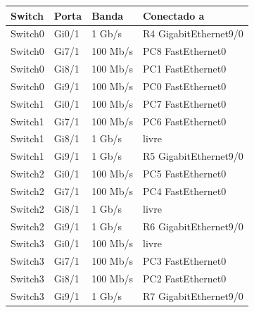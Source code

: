 \begin{tabular}{llll}
\toprule
Switch & Porta & Banda & Conectado a\\
\midrule
Switch0 & Gi0/1 & 1 Gb/s & R4 GigabitEthernet9/0\\
Switch0 & Gi7/1 & 100 Mb/s & PC8 FastEthernet0\\
Switch0 & Gi8/1 & 100 Mb/s & PC1 FastEthernet0\\
Switch0 & Gi9/1 & 100 Mb/s & PC0 FastEthernet0\\
\midrule
Switch1 & Gi0/1 & 100 Mb/s & PC7 FastEthernet0\\
Switch1 & Gi7/1 & 100 Mb/s & PC6 FastEthernet0\\
Switch1 & Gi8/1 & 1 Gb/s & livre\\
Switch1 & Gi9/1 & 1 Gb/s & R5 GigabitEthernet9/0\\
\midrule
Switch2 & Gi0/1 & 100 Mb/s & PC5 FastEthernet0\\
Switch2 & Gi7/1 & 100 Mb/s & PC4 FastEthernet0\\
Switch2 & Gi8/1 & 1 Gb/s & livre\\
Switch2 & Gi9/1 & 1 Gb/s & R6 GigabitEthernet9/0\\
\midrule
Switch3 & Gi0/1 & 100 Mb/s & livre\\
Switch3 & Gi7/1 & 100 Mb/s & PC3 FastEthernet0\\
Switch3 & Gi8/1 & 100 Mb/s & PC2 FastEthernet0\\
Switch3 & Gi9/1 & 1 Gb/s & R7 GigabitEthernet9/0\\
\bottomrule
\end{tabular}
